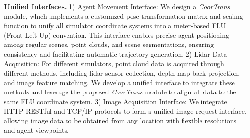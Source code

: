 \textbf{Unified Interfaces.} 
1) Agent Movement Interface: We design a \textit{CoorTrans} module, which implements a customized pose transformation matrix and scaling function to unify all simulator coordinate systems into a meter-based FLU (Front-Left-Up) convention. This interface enables precise agent positioning among regular scenes, point clouds, and scene segmentations, ensuring consistency and facilitating automatic trajectory generation.
2) Lidar Data Acquisition: For different simulators, point cloud data is acquired  through different methods, including lidar sensor collection, depth map back-projection, and image feature matching. We develop a unified interface to integrate these methods and leverage the proposed \textit{CoorTrans} module to align all data to the same FLU coordinate system.
3) Image Acquisition Interface: We integrate HTTP RESTful and TCP/IP protocols to form a unified image request interface, allowing image data to be obtained from any location with flexible  resolutions and agent viewpoints. 

